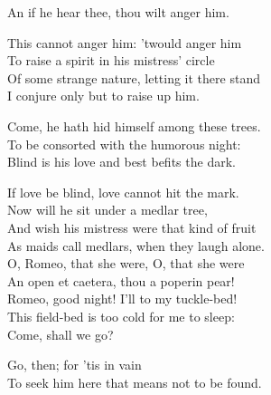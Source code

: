 \begin{speech}
An if he hear thee, thou wilt anger him. \\
\end{speech}
\begin{speech}
This cannot anger him:  'twould anger him \\
To raise a spirit in his mistress' circle \\
Of some strange nature, letting it there stand \\
I conjure only but to raise up him. \\
\end{speech}
\begin{speech}
Come, he hath hid himself among these trees. \\
To be consorted with the humorous night: \\
Blind is his love and best befits the dark. \\
\end{speech}
\begin{speech}
If love be blind, love cannot hit the mark. \\
Now will he sit under a medlar tree, \\
And wish his mistress were that kind of fruit \\
As maids call medlars, when they laugh alone. \\
O, Romeo, that she were, O, that she were \\
An open et caetera, thou a poperin pear! \\
Romeo, good night!   I'll to my tuckle-bed! \\
This field-bed is too cold for me to sleep: \\
Come, shall we go? \\
\end{speech}
\begin{speech}
Go, then; for 'tis in vain \\
To seek him here that means not to be found. 
\\
\end{speech}


